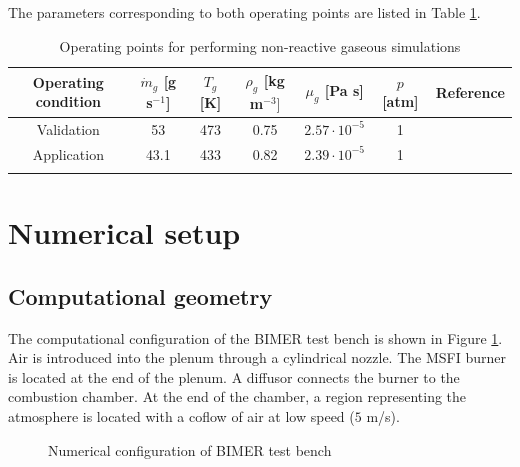 The parameters corresponding to both operating points are listed in Table \ref{tab:gaseous_operating_points_BIMER}. 
\begin{table}[!h]
\centering
\caption{Operating points for performing non-reactive gaseous simulations}
\begin{tabular}{ccccccc}
\thickhline
Operating condition    & $\dot{m}_g$ [g s$^{-1}$] & $T_g$ [K] & $\rho_g$ [kg m$^{-3}]$  & $\mu_g$ [Pa s] & $p$ [atm]  & Reference\\
\hline
Validation &   53 & 473 & 0.75 & $2.57 \cdot 10^{-5}$ & 1 & \\
Application  & 43.1 & 433 & 0.82 & $2.39 \cdot 10^{-5}$ & 1 &  \\
\thickhline
\end{tabular}
\label{tab:gaseous_operating_points_BIMER}
\end{table}



\section{Numerical setup}


\subsection{Computational geometry}

The computational configuration of the BIMER test bench is shown in Figure \ref{fig:BIMER_geometry_full_domain}. Air is introduced into the plenum through a cylindrical nozzle. The MSFI burner is located at the end of the plenum. A diffusor connects the burner to the combustion chamber. At the end of the chamber, a region representing the atmosphere is located with a coflow of air at low speed ($5$ m/s). 

\begin{figure}[h!]
	\centering
	\caption{Numerical configuration of BIMER test bench}
	\label{fig:BIMER_geometry_full_domain}
\end{figure}

